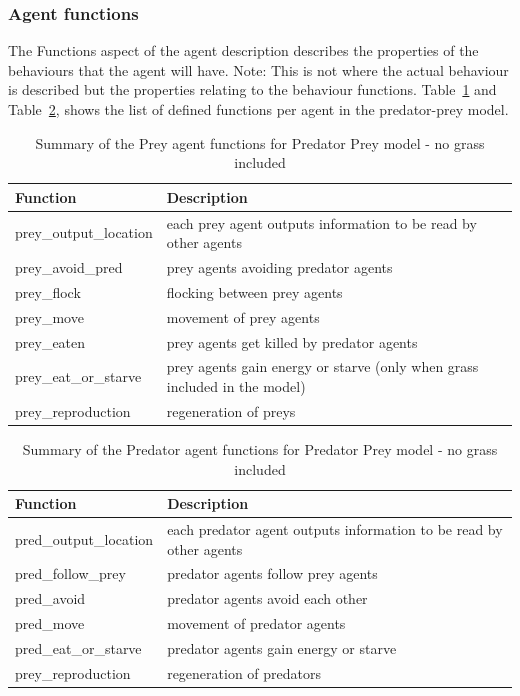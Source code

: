\subsubsection{Agent functions} %
The Functions aspect of the agent description describes the properties of the behaviours that the agent will have. Note: This is not where the actual behaviour is described but the properties relating to the behaviour functions. Table~\ref{tab:1} and Table~\ref{tab:2}, shows the list of defined functions per agent in the predator-prey model. 


\begin{table}[h]
\centering
\caption{Summary of the Prey agent functions for Predator Prey model - no grass included}
\begin{tabular}{ |l|l| } 
\hline
Function & Description\\
\hline\hline
prey\_output\_location& each prey agent outputs information to be read by other agents\\\hline
prey\_avoid\_pred& prey agents avoiding predator agents\\\hline
prey\_flock& flocking between prey agents\\\hline
prey\_move & movement of prey agents\\\hline
prey\_eaten & prey agents get killed by predator agents\\\hline
prey\_eat\_or\_starve & prey agents gain energy or starve (only when grass included in the model)\\\hline
prey\_reproduction & regeneration of preys\\
\hline
\end{tabular}
\label{tab:1}
\end{table}

\begin{table}[h]
\centering
\caption{Summary of the Predator agent functions for Predator Prey model - no grass included}
\begin{tabular}{ |l|l| } 
\hline
Function & Description\\
\hline\hline
pred\_output\_location& each predator agent outputs information to be read by other agents\\\hline
pred\_follow\_prey& predator agents follow prey agents\\\hline
pred\_avoid& predator agents avoid each other\\\hline
pred\_move & movement of predator agents\\\hline
pred\_eat\_or\_starve & predator agents gain energy or starve\\\hline
prey\_reproduction & regeneration of predators\\
\hline
\end{tabular}
\label{tab:2}
\end{table}



